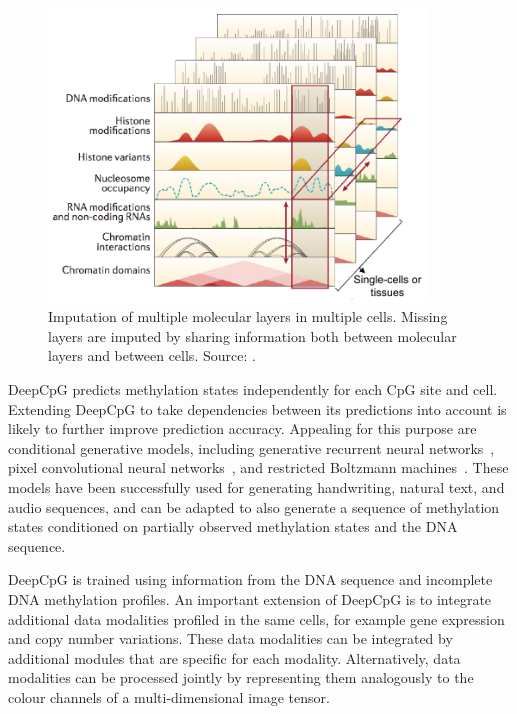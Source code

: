 \begin{figure}[htbp!]
\centering
\includegraphics[width=0.9\textwidth]{multi}
\caption[Imputation of multiple molecular layers in multiple cells.]{Imputation of multiple molecular layers in multiple cells. Missing layers are imputed by sharing information both between molecular layers and between cells. Source: \citet{stricker_profiles_2016}.}
\label{fig:sum_multi}
\end{figure}

DeepCpG predicts methylation states independently for each CpG site and cell. Extending DeepCpG to take dependencies between its predictions into account is likely to further improve prediction accuracy. Appealing for this purpose are conditional generative models, including generative recurrent neural networks~\citep{graves_generating_2013, chung_recurrent_2015}, pixel convolutional neural networks~\citep{oord_pixel_2016,kalchbrenner_neural_2016,oord_wavenet:_2016}, and restricted Boltzmann machines~\citep{sutskever_recurrent_2009,boulanger-lewandowski_modeling_2012,boulanger-lewandowski_high-dimensional_2013,bayer_learning_2014}. These models have been successfully used for generating handwriting, natural text, and audio sequences, and can be adapted to also generate a sequence of methylation states conditioned on partially observed methylation states and the DNA sequence.

DeepCpG is trained using information from the DNA sequence and incomplete DNA methylation profiles. An important extension of DeepCpG is to integrate additional data modalities profiled in the same cells, for example gene expression and copy number variations. These data modalities can be integrated by additional modules that are specific for each modality. Alternatively, data modalities can be processed jointly by representing them analogously to the colour channels of a multi-dimensional image tensor.

